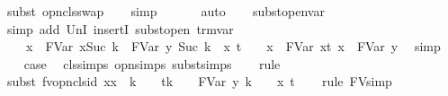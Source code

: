 \begin{isabellebody}
\ {\isacharparenleft}subst\ opn{\isacharunderscore}cls{\isacharunderscore}swap{}{\isacharparenright}\isanewline
\ \ \isamarkupfalse%
\ simp\isanewline
\ \ \isamarkupfalse%
\ {}\ \isamarkupfalse%
\ auto{\isacharbrackleft}{}{\isacharbrackright}\isanewline
\ \ \isamarkupfalse%
\ subst{\isacharunderscore}open{\isacharunderscore}var\ {}\ \isamarkupfalse%
\ {\isacharparenleft}simp\ add{\isacharcolon}\ UnI{}\ insertI{}\ subst{\isacharunderscore}open\ trm{\isachardot}var{\isacharparenright}\isanewline
\ \ \isamarkupfalse%
\ \isamarkupfalse%
\ {}{\isacharcolon}\ {\isachardoublequoteopen}{\isacharbraceleft}{}\ {\isacharless}{\isacharminus}\ x{\isacharprime}{\isacharbraceright}{\isacharbraceleft}{}\ {\isasymrightarrow}\ FVar\ x{\isacharprime}{\isacharbraceright}{\isacharbraceleft}Suc\ k\ {\isasymrightarrow}\ FVar\ y{\isacharbraceright}\ {\isacharbraceleft}Suc\ k\ {\isacharless}{\isacharminus}\ x{\isacharbraceright}\ t\ {\isacharequal}\ {\isacharbraceleft}{}\ {\isacharless}{\isacharminus}\ x{\isacharprime}{\isacharbraceright}{\isacharbraceleft}{}\ {\isasymrightarrow}\ FVar\ x{\isacharprime}{\isacharbraceright}{\isacharparenleft}t\ {\isacharbrackleft}x\ {\isacharcolon}{\isacharcolon}{\isacharequal}\ FVar\ y{\isacharbrackright}{\isacharparenright}{\isachardoublequoteclose}\ \isamarkupfalse%
\ simp\isanewline
\isanewline
\ \ \isamarkupfalse%
\ {\isacharquery}case\ \isamarkupfalse%
\ cls{\isachardot}simps\ opn{\isachardot}simps\ subst{\isachardot}simps\isanewline
\ \ \isamarkupfalse%
\ rule\isanewline
\ \ \isamarkupfalse%
\ {\isacharparenleft}subst\ fv{\isacharunderscore}opn{\isacharunderscore}cls{\isacharunderscore}id{}{\isacharbrackleft}\ x{\isacharequal}x{\isacharprime}\ \ k\ {\isacharequal}\ {}\ \ t{\isacharequal}{\isachardoublequoteopen}{\isacharbraceleft}k\ {\isacharplus}\ {}\ {\isasymrightarrow}\ FVar\ y{\isacharbraceright}\ {\isacharbraceleft}k\ {\isacharplus}\ {}\ {\isacharless}{\isacharminus}\ x{\isacharbraceright}\ t{\isachardoublequoteclose}{\isacharbrackright}{\isacharparenright}\isanewline
\ \ \isamarkupfalse%
\ {\isacharparenleft}rule\ FV{\isacharunderscore}simp{\isacharparenright}\isanewline
\ \ \isamarkupfalse%

\end{isabellebody}
